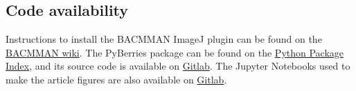 \subsection*{Code availability}
Instructions to install the BACMMAN ImageJ plugin can be found on the \href{https://github.com/jeanollion/bacmman/wiki/Installation}{BACMMAN wiki}. The PyBerries package can be found on the \href{https://pypi.org/project/PyBerries/}{Python Package Index}, and its source code is available on \href{https://gitlab.com/MEKlab/pyberries}{Gitlab}. The Jupyter Notebooks used to make the article figures are also available on \href{https://gitlab.com/MEKlab/recb_article_figures}{Gitlab}.



